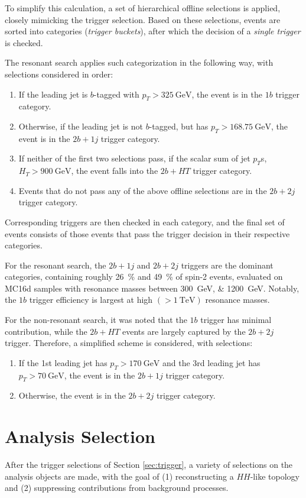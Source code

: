 To simplify this calculation, a set of hierarchical offline selections is applied, closely 
mimicking the trigger selection. Based on these selections, events are sorted into categories
(\emph{trigger buckets}), after which the decision of a \emph{single trigger} is checked. 

The resonant search applies such categorization in the following way, with 
selections considered in order:
\begin{enumerate}
	\item If the leading jet is $b$-tagged with $p_{T} > \SI{325}{\GeV}$, the event is in the $1b$ trigger category.
	\item Otherwise, if the leading jet is not $b$-tagged, but has $p_{T} > \SI{168.75}{\GeV}$, the event is in the $2b+1j$
	trigger category.
	\item If neither of the first two selections pass, if the scalar sum of jet $p_{T}$s, $H_{T} > \SI{900}{\GeV}$,
	the event falls into the $2b+HT$ trigger category.
	\item Events that do not pass any of the above offline selections are in the $2b+2j$ trigger category.
\end{enumerate}
Corresponding triggers are then checked in each category, and the final set of events consists of those events that 
pass the trigger decision in their respective categories. 

For the resonant search, the $2b+1j$ and $2b+2j$ triggers are the dominant categories, containing roughly 26~\% and
49~\% of spin-2 events, evaluated on MC16d samples with resonance masses between \SIlist{300;1200}{\GeV}. Notably, 
the $1b$ trigger efficiency is largest at high $(>\SI{1}{\TeV})$ resonance masses.

For the non-resonant search, it was noted that the $1b$ trigger has minimal contribution, while the $2b+HT$ events are 
largely captured by the $2b+2j$ trigger. Therefore, a simplified scheme is considered, 
with selections:
\begin{enumerate}
	\item If the 1st leading jet has $p_{T} > \SI{170}{\GeV}$ and the 3rd leading jet has $p_{T} > \SI{70}{\GeV}$,
	the event is in the $2b+1j$ trigger category.
	\item Otherwise, the event is in the $2b+2j$ trigger category.
\end{enumerate}


\section{Analysis Selection}
\label{sec:analysis-selection}
After the trigger selections of Section \ref{sec:trigger}, a variety of selections on the analysis objects
are made, with the goal of (1) reconstructing a $HH$-like topology and (2) suppressing contributions from 
background processes. 

